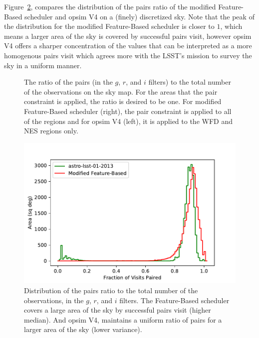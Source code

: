 \documentclass[12pt]{aastex62}
\theoremstyle{definition}
\begin{document}
 Figure~\ref{fig_10yrs_pair_hist}, compares the distribution of the pairs ratio of the modified Feature-Based scheduler and opsim V4 on a (finely) discretized sky. Note that the peak of the distribution for the modified Feature-Based scheduler is closer to $1$, which means a larger area of the sky is covered by successful pairs visit, however opsim V4 offers a sharper concentration of the values that can be interpreted as a more homogenous pairs visit which agrees more with the LSST's mission to survey the sky in a uniform manner.
\begin{figure}[h!]
\caption{The ratio of the pairs (in the $g$, $r$, and $i$ filters) to the total number of the observations on the sky map. For the areas that the pair constraint is applied, the ratio is desired to be one. For modified Feature-Based scheduler (right), the pair constraint is applied to all of the regions and for opsim V4 (left), it is applied to the WFD and NES regions only.}
\label{fig_10yrs_pair}
\end{figure}
%
\begin{figure}[h!]
\centering
\includegraphics[width=.4\linewidth]{PairHist.pdf}
\caption{Distribution of the pairs ratio to the total number of the observations, in the $g$, $r$, and $i$ filters. The Feature-Based scheduler covers a large area of the sky by successful pairs visit (higher median). And opsim V4, maintains a uniform ratio of pairs for a larger area of the sky (lower variance).}
\label{fig_10yrs_pair_hist}
\end{figure}
\end{document}
